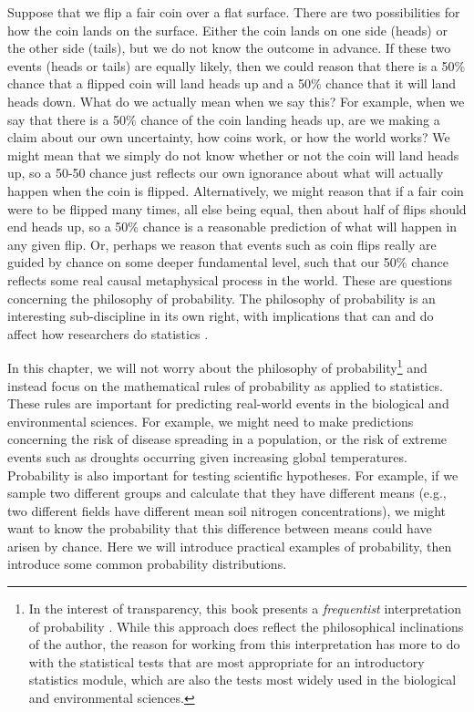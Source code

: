 \documentclass[
  openany]{scrbook}
\begin{document}
Suppose that we flip a fair coin over a flat surface.
There are two possibilities for how the coin lands on the surface.
Either the coin lands on one side (heads) or the other side (tails), but we do not know the outcome in advance.
If these two events (heads or tails) are equally likely, then we could reason that there is a 50\% chance that a flipped coin will land heads up and a 50\% chance that it will land heads down.
What do we actually mean when we say this?
For example, when we say that there is a 50\% chance of the coin landing heads up, are we making a claim about our own uncertainty, how coins work, or how the world works?
We might mean that we simply do not know whether or not the coin will land heads up, so a 50-50 chance just reflects our own ignorance about what will actually happen when the coin is flipped.
Alternatively, we might reason that if a fair coin were to be flipped many times, all else being equal, then about half of flips should end heads up, so a 50\% chance is a reasonable prediction of what will happen in any given flip.
Or, perhaps we reason that events such as coin flips really are guided by chance on some deeper fundamental level, such that our 50\% chance reflects some real causal metaphysical process in the world.
These are questions concerning the philosophy of probability.
The philosophy of probability is an interesting sub-discipline in its own right, with implications that can and do affect how researchers do statistics \citep{Edwards1972, Mayo1996, Gelman2013, Suarez2020, Mayo2021, Navarro2022}.

In this chapter, we will not worry about the philosophy of probability\footnote{In the interest of transparency, this book presents a \emph{frequentist} interpretation of probability \citep{Mayo1996}. While this approach does reflect the philosophical inclinations of the author, the reason for working from this interpretation has more to do with the statistical tests that are most appropriate for an introductory statistics module, which are also the tests most widely used in the biological and environmental sciences.} and instead focus on the mathematical rules of probability as applied to statistics.
These rules are important for predicting real-world events in the biological and environmental sciences.
For example, we might need to make predictions concerning the risk of disease spreading in a population, or the risk of extreme events such as droughts occurring given increasing global temperatures.
Probability is also important for testing scientific hypotheses.
For example, if we sample two different groups and calculate that they have different means (e.g., two different fields have different mean soil nitrogen concentrations), we might want to know the probability that this difference between means could have arisen by chance.
Here we will introduce practical examples of probability, then introduce some common probability distributions.
\end{document}
